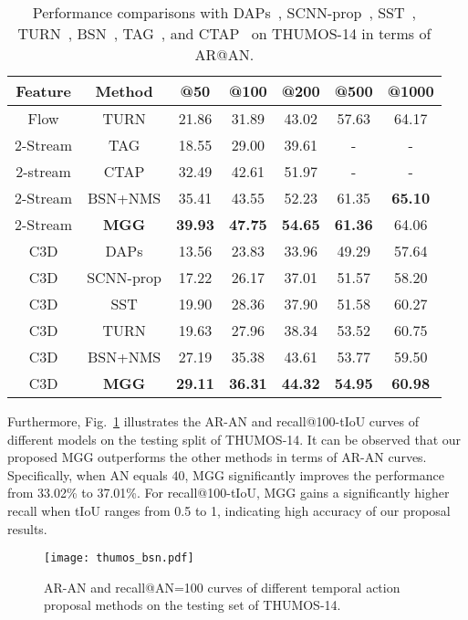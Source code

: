\documentclass[10pt,twocolumn,letterpaper]{article}
\begin{document}
\begin{table}
\scriptsize \centering \caption{\label{prop_thu}Performance comparisons with DAPs~\cite{dap}, SCNN-prop~\cite{shou_action}, SST~\cite{sst}, TURN~\cite{turn_tap}, BSN~\cite{bsn}, TAG~\cite{TAG}, and CTAP~\cite{ctap} on THUMOS-14 in terms of AR@AN.}
\label{tab:tab2}
\begin{tabular}{c|c|c|c|c|c|c}
\toprule Feature &Method &@50 & @100&@200 &@500& @1000\\\midrule
Flow & TURN& 21.86& 31.89& 43.02& 57.63&64.17\\
2-Stream & TAG& 18.55& 29.00& 39.61& -&-\\
2-stream & CTAP & 32.49 &42.61&51.97&-&-\\
2-Stream & BSN+NMS& 35.41& 43.55& 52.23& 61.35&\textbf{65.10}\\
2-Stream & \textbf{MGG}&\textbf{39.93} &\textbf{47.75} &\textbf{54.65} &\textbf{61.36} &64.06\\

\midrule
C3D&DAPs & 13.56& 23.83& 33.96&49.29 &57.64\\
C3D &SCNN-prop&17.22 & 26.17& 37.01& 51.57&58.20\\
C3D & SST& 19.90& 28.36& 37.90& 51.58&60.27\\
C3D & TURN& 19.63& 27.96& 38.34& 53.52&60.75\\
C3D & BSN+NMS& 27.19& 35.38& 43.61& 53.77&59.50\\
C3D & \textbf{MGG}&\textbf{29.11} &\textbf{36.31} & \textbf{44.32}&\textbf{54.95} &\textbf{60.98}\\




\bottomrule
\end{tabular}
\end{table}


Furthermore, Fig.~\ref{thumos} illustrates the AR-AN and recall@100-tIoU curves of different models on the testing split of THUMOS-14. It can be observed that our proposed MGG outperforms the other methods  in terms of AR-AN curves. Specifically, when AN equals 40, MGG significantly improves the performance from 33.02\% to 37.01\%. For recall@100-tIoU,
MGG gains a significantly higher recall when tIoU ranges from 0.5 to 1, indicating high accuracy of our proposal results.

\begin{figure}[]
\centering
\texttt{[image: thumos\_bsn.pdf]}
\caption{AR-AN and recall@AN=100 curves of different temporal action proposal methods on the testing set of THUMOS-14.}
\label{thumos}
\end{figure}
\end{document}

